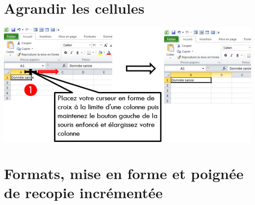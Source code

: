 \section{Agrandir les cellules} 
\begin{center} 
	\includegraphics[scale=0.2,width=0.9 \linewidth]{img/agrandir_cellule} 
\end{center}
\section{Formats,  mise en forme et poignée de recopie incrémentée}
